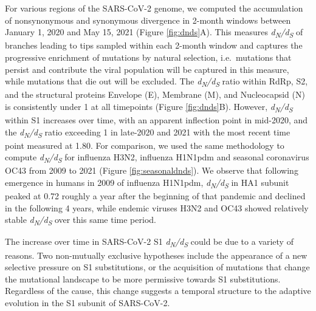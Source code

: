 \documentclass[11pt,oneside,letterpaper]{article}
\newcommand{\dnds}{\emph{d\textsubscript{N}/d\textsubscript{S}}}
\begin{document}
For various regions of the SARS-CoV-2 genome, we computed the accumulation of nonsynonymous and synonymous divergence in 2-month windows between January 1, 2020 and May 15, 2021 (Figure \ref{fig:dnds}A).
This measures \dnds{} of branches leading to tips sampled within each 2-month window and captures the progressive enrichment of mutations by natural selection, i.e.\ mutations that persist and contribute the viral population will be captured in this measure, while mutations that die out will be excluded.
The \dnds{} ratio within RdRp, S2, and the structural proteins Envelope (E), Membrane (M), and Nucleocapsid (N) is consistently under 1 at all timepoints (Figure \ref{fig:dnds}B).
However, \dnds{} within S1 increases over time, with an apparent inflection point in mid-2020, and the \dnds{} ratio exceeding 1 in late-2020 and 2021 with the most recent time point measured at 1.80.
For comparison, we used the same methodology to compute \dnds{} for influenza H3N2, influenza H1N1pdm and seasonal coronavirus OC43 from 2009 to 2021 (Figure \ref{fig:seasonaldnds}).
We observe that following emergence in humans in 2009 of influenza H1N1pdm, \dnds{} in HA1 subunit peaked at 0.72 roughly a year after the beginning of that pandemic and declined in the following 4 years, while endemic viruses H3N2 and OC43 showed relatively stable \dnds{} over this same time period.

The increase over time in SARS-CoV-2 S1 \dnds{} could be due to a variety of reasons.
Two non-mutually exclusive hypotheses include the appearance of a new selective pressure on S1 substitutions, or the acquisition of mutations that change the mutational landscape to be more permissive towards S1 substitutions.
Regardless of the cause, this change suggests a temporal structure to the adaptive evolution in the S1 subunit of SARS-CoV-2.
\end{document}
